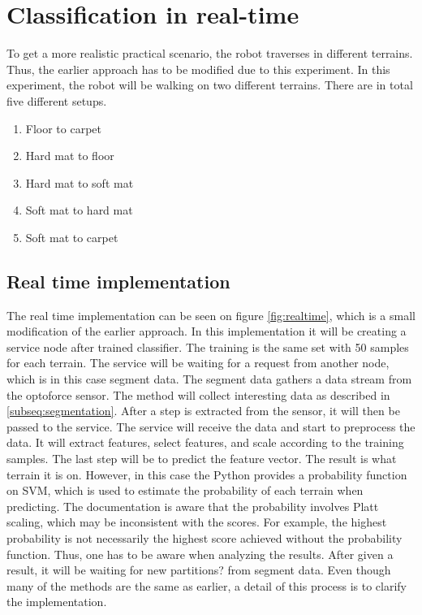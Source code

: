 \documentclass[USenglish]{ifimaster}  %
\begin{document}
\section{Classification in real-time} \label{sec:realtime}
To get a more realistic practical scenario, the robot traverses in different terrains. Thus, the earlier approach has to be modified due to this experiment. In this experiment, the robot will be walking on two different terrains. There are in total five different setups.
	
	
	\begin{enumerate}
		\item Floor to carpet
		\item Hard mat to floor
		\item Hard mat to soft mat
		\item Soft mat to hard mat
		\item Soft mat to carpet
	\end{enumerate}
	
\subsection{Real time implementation} %
The real time implementation can be seen on figure \ref{fig:realtime}, which is a small modification of the earlier approach. In this implementation  it will be creating a service node after trained classifier. The training is the same set with 50 samples for each terrain. The service will be waiting for a request from another node, which is in this case segment data. The segment data gathers a data stream from the optoforce sensor. The method will collect interesting data as described in \ref{subseq:segmentation}. After a step is extracted from the sensor, it will then be passed to the service. The service will receive the data and start to preprocess the data. It will extract features, select features, and scale according to the training samples. The last step will be to predict the feature vector. The result is what terrain it is on. However, in this case the Python provides a probability function on SVM, which is used to estimate the probability of each terrain when predicting. The documentation is aware that the probability involves Platt scaling, which may be inconsistent with the scores. For example, the highest probability is not necessarily the highest score achieved without the probability function. Thus, one has to be aware when analyzing the results. After given a result, it will be waiting for new partitions? from segment data. Even though many of the methods are the same as earlier, a detail of this process is to clarify the implementation.
	
\end{document}
